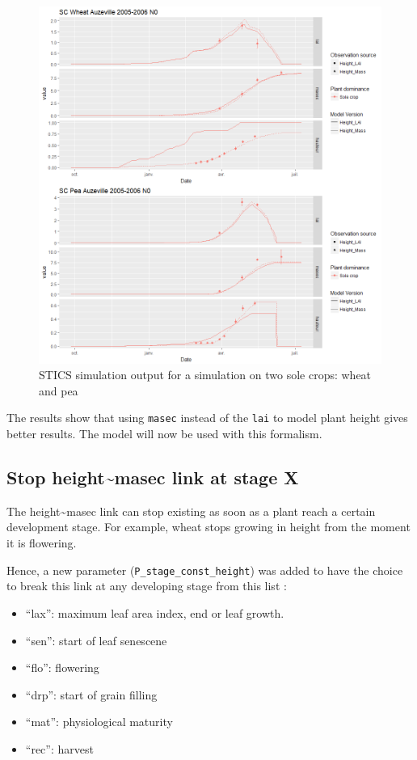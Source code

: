 \documentclass[]{book}
\providecommand{\tightlist}{%
  \setlength{\itemsep}{0pt}\setlength{\parskip}{0pt}}
\begin{document}
\begin{figure}
\centering
\includegraphics{img/height_Wheat_SC.png}
\caption{\label{fig:heightWheatSC}STICS simulation output for a simulation on two sole crops: wheat and pea}
\end{figure}

The results show that using \texttt{masec} instead of the \texttt{lai} to model plant height gives better results. The model will now be used with this formalism.

\hypertarget{stop-heightmasec-link-at-stage-x}{%
\subsection{Stop height\textasciitilde{}masec link at stage X}\label{stop-heightmasec-link-at-stage-x}}

The height\textasciitilde{}masec link can stop existing as soon as a plant reach a certain development stage. For example, wheat stops growing in height from the moment it is flowering.

Hence, a new parameter (\texttt{P\_stage\_const\_height}) was added to have the choice to break this link at any developing stage from this list :

\begin{itemize}
\tightlist
\item
  ``lax'': maximum leaf area index, end or leaf growth.\\
\item
  ``sen'': start of leaf senescene\\
\item
  ``flo'': flowering\\
\item
  ``drp'': start of grain filling\\
\item
  ``mat'': physiological maturity\\
\item
  ``rec'': harvest
\end{itemize}
\end{document}
